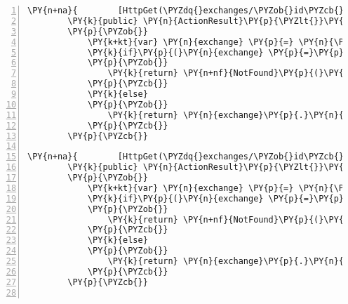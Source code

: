 \begin{Verbatim}[commandchars=\\\{\},numbers=left,firstnumber=1,stepnumber=1,numberblanklines=0]
\PY{n+na}{        [HttpGet(\PYZdq{}exchanges/\PYZob{}id\PYZcb{}/stats/id/\PYZob{}statId\PYZcb{}\PYZdq{})]}
        \PY{k}{public} \PY{n}{ActionResult}\PY{p}{\PYZlt{}}\PY{n}{Stat}\PY{p}{\PYZgt{}} \PY{n}{GetByID}\PY{p}{(}\PY{k+kt}{int} \PY{n}{id}\PY{p}{,} \PY{k+kt}{int} \PY{n}{statId}\PY{p}{)}
        \PY{p}{\PYZob{}}
            \PY{k+kt}{var} \PY{n}{exchange} \PY{p}{=} \PY{n}{\PYZus{}context}\PY{p}{.}\PY{n}{Exchanges}\PY{p}{.}\PY{n}{Where}\PY{p}{(}\PY{n}{e} \PY{p}{=}\PY{p}{\PYZgt{}} \PY{n}{e}\PY{p}{.}\PY{n}{ExchangeId} \PY{p}{=}\PY{p}{=} \PY{n}{id}\PY{p}{)}\PY{p}{.}\PY{n}{First}\PY{p}{(}\PY{p}{)}\PY{p}{;}
            \PY{k}{if}\PY{p}{(}\PY{n}{exchange} \PY{p}{=}\PY{p}{=} \PY{k}{null}\PY{p}{)}
            \PY{p}{\PYZob{}}
                \PY{k}{return} \PY{n+nf}{NotFound}\PY{p}{(}\PY{p}{)}\PY{p}{;}
            \PY{p}{\PYZcb{}}
            \PY{k}{else}
            \PY{p}{\PYZob{}}
                \PY{k}{return} \PY{n}{exchange}\PY{p}{.}\PY{n}{Stats}\PY{p}{.}\PY{n}{Where}\PY{p}{(}\PY{n}{s} \PY{p}{=}\PY{p}{\PYZgt{}} \PY{n}{s}\PY{p}{.}\PY{n}{StatId} \PY{p}{=}\PY{p}{=} \PY{n}{statId}\PY{p}{)}\PY{p}{.}\PY{n}{First}\PY{p}{(}\PY{p}{)}\PY{p}{;}
            \PY{p}{\PYZcb{}}
        \PY{p}{\PYZcb{}}

\PY{n+na}{        [HttpGet(\PYZdq{}exchanges/\PYZob{}id\PYZcb{}/stats/startDate/\PYZob{}startDate\PYZcb{}\PYZdq{})]}
        \PY{k}{public} \PY{n}{ActionResult}\PY{p}{\PYZlt{}}\PY{n}{List}\PY{p}{\PYZlt{}}\PY{n}{Stat}\PY{p}{\PYZgt{}}\PY{p}{\PYZgt{}} \PY{n}{GetByStartDate}\PY{p}{(}\PY{k+kt}{int} \PY{n}{id}\PY{p}{,} \PY{n}{DateTime} \PY{n}{startDate}\PY{p}{)}
        \PY{p}{\PYZob{}}
            \PY{k+kt}{var} \PY{n}{exchange} \PY{p}{=} \PY{n}{\PYZus{}context}\PY{p}{.}\PY{n}{Exchanges}\PY{p}{.}\PY{n}{Where}\PY{p}{(}\PY{n}{e} \PY{p}{=}\PY{p}{\PYZgt{}} \PY{n}{e}\PY{p}{.}\PY{n}{ExchangeId} \PY{p}{=}\PY{p}{=} \PY{n}{id}\PY{p}{)}\PY{p}{.}\PY{n}{First}\PY{p}{(}\PY{p}{)}\PY{p}{;}
            \PY{k}{if}\PY{p}{(}\PY{n}{exchange} \PY{p}{=}\PY{p}{=} \PY{k}{null}\PY{p}{)}
            \PY{p}{\PYZob{}}
                \PY{k}{return} \PY{n+nf}{NotFound}\PY{p}{(}\PY{p}{)}\PY{p}{;}
            \PY{p}{\PYZcb{}}
            \PY{k}{else}
            \PY{p}{\PYZob{}}
                \PY{k}{return} \PY{n}{exchange}\PY{p}{.}\PY{n}{Stats}\PY{p}{.}\PY{n}{Where}\PY{p}{(}\PY{n}{s} \PY{p}{=}\PY{p}{\PYZgt{}} \PY{n}{s}\PY{p}{.}\PY{n}{startDate}\PY{p}{.}\PY{n}{Equals}\PY{p}{(}\PY{n}{startDate}\PY{p}{)}\PY{p}{)}\PY{p}{.}\PY{n}{ToList}\PY{p}{(}\PY{p}{)}\PY{p}{;}
            \PY{p}{\PYZcb{}}
        \PY{p}{\PYZcb{}}


\end{Verbatim}

